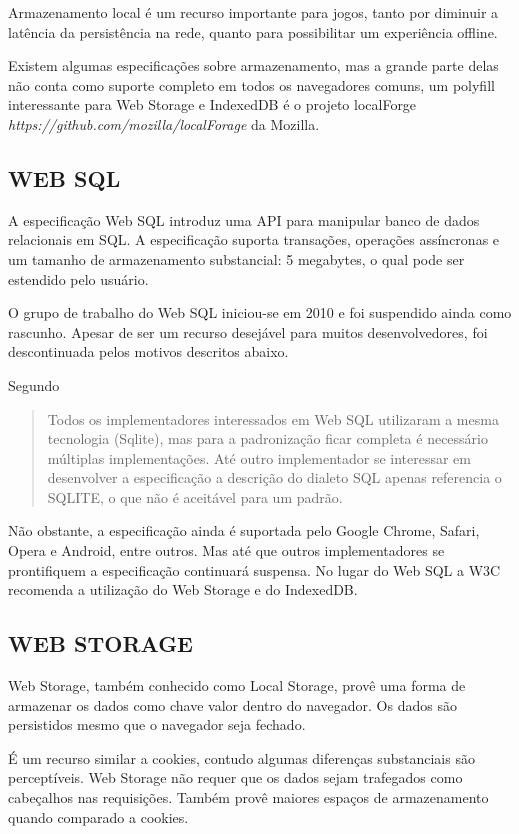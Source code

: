 Armazenamento local é um recurso importante para jogos, tanto por
diminuir a latência da persistência na rede, quanto para possibilitar
um experiência offline.

Existem algumas especificações sobre armazenamento, mas a grande
parte delas não conta como suporte completo em todos os navegadores
comuns, um polyfill interessante para Web Storage  e IndexedDB é o
projeto localForge \textit{https://github.com/mozilla/localForage} da
Mozilla.

\subsection{WEB SQL}

A especificação Web SQL introduz uma API para manipular banco de dados
relacionais em SQL. A especificação suporta transações, operações
assíncronas e um tamanho de armazenamento substancial: 5 megabytes, o
qual pode ser estendido pelo usuário.

O grupo de trabalho do Web SQL iniciou-se em 2010 e foi suspendido ainda
como rascunho. Apesar de ser um recurso desejável para muitos
desenvolvedores, foi descontinuada pelos motivos descritos abaixo.

Segundo \cite{diveIntohtml}
\begin{quote}
Todos os implementadores interessados em Web SQL utilizaram a mesma
tecnologia (Sqlite), mas para a padronização ficar completa é
necessário múltiplas implementações. Até outro implementador se
interessar em desenvolver a especificação a descrição do dialeto SQL
apenas referencia o SQLITE, o que não é aceitável para um padrão.
\end{quote}

Não obstante, a especificação ainda é suportada pelo Google
Chrome, Safari, Opera e Android, entre outros. Mas até que outros
implementadores se prontifiquem a especificação continuará suspensa.
No lugar do Web SQL a W3C recomenda a utilização do Web Storage e do
IndexedDB.

\subsection{WEB STORAGE}

Web Storage, também conhecido como Local Storage, provê uma forma de
armazenar os dados como chave valor dentro do navegador. Os dados são
persistidos mesmo que o navegador seja fechado.

É um recurso similar a cookies, contudo algumas diferenças
substanciais são perceptíveis. Web Storage não requer que os dados
sejam trafegados como cabeçalhos nas requisições. Também provê
maiores espaços de armazenamento quando comparado a cookies.

